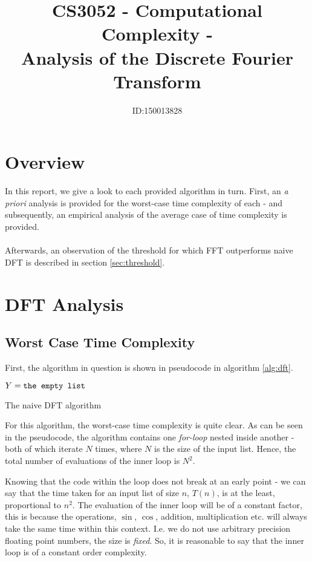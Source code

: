 \documentclass[]{article}
\title{CS3052 - Computational Complexity -\\Analysis of the Discrete Fourier Transform}
\author{ID:150013828}
\begin{document}
\maketitle

\section{Overview}
In this report, we give a look to each provided algorithm in turn. First, an \emph{a priori} analysis is provided for the worst-case time complexity of each - and subsequently, an empirical analysis of the average case of time complexity is provided.
\\\\
Afterwards, an observation of the threshold for which FFT outperforms naive DFT is described in section \ref{sec:threshold}.

\section{DFT Analysis}\label{sec:dft}
\subsection{Worst Case Time Complexity}
First, the algorithm in question is shown in pseudocode in algorithm \ref{alg:dft}.
\begin{algorithm}[h]
	$Y = \verb|the empty list|$\\
\caption{The naive DFT algorithm\label{alg:dft}}
\end{algorithm}

For this algorithm, the worst-case time complexity is quite clear. As can be seen in the pseudocode, the algorithm contains one \emph{for-loop} nested inside another - both of which iterate $N$ times, where $N$ is the size of the input list. Hence, the total number of evaluations of the inner loop is $N^2$.
	
Knowing that the code within the loop does not break at an early point - we can say that the time taken for an input list of size $n$, $T(n)$, is at the least, proportional to $n^2$. The evaluation of the inner loop will be of a constant factor, this is because the operations, $\sin$, $\cos$, addition, multiplication etc. will always take the same time within this context. I.e. we do not use arbitrary precision floating point numbers, the size is \emph{fixed}. So, it is reasonable to say that the inner loop is of a constant order complexity.
\end{document}
